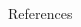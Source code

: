 \documentclass[final,hyperref={pdfpagelabels=false},notheorems]{beamer}
\theoremstyle{thesisstyle}
\begin{document}
\begin{frame}[t]
\begin{columns}[t]
\begin{column}{.5225\textwidth}
    \begin{block}{References}
      \linespread{0.928}\selectfont
      \printbibliography[heading=none]
    \end{block}

  \end{column}

  \begin{column}{.015\textwidth}\end{column} %

\end{columns} %

\end{frame} %
\end{document}

